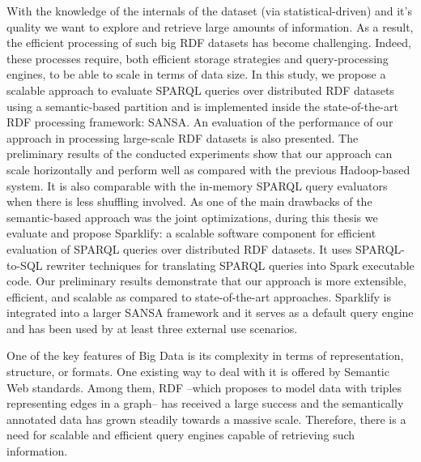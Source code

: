 With the knowledge of the internals of the dataset (via statistical-driven) and it's quality we want to explore and retrieve large amounts of information.
As a result, the efficient processing of such big RDF datasets has become challenging.
Indeed, these processes require, both efficient storage strategies and query-processing engines, to be able to scale in terms of data size.
In this study, we propose a scalable approach to evaluate SPARQL queries over distributed RDF datasets using a semantic-based partition and is implemented inside the state-of-the-art RDF processing framework: SANSA.
An evaluation of the performance of our approach in processing large-scale RDF datasets is also presented. 
The preliminary results of the conducted experiments show that our approach can scale horizontally and perform well as compared with the previous Hadoop-based system.
It is also comparable with the in-memory SPARQL query evaluators when there is less shuffling involved.
As one of the main drawbacks of the semantic-based approach was the joint optimizations, during this thesis we evaluate and propose Sparklify: a scalable software component for efficient evaluation of SPARQL queries over distributed RDF datasets. 
It uses SPARQL-to-SQL rewriter techniques for translating SPARQL queries into Spark executable code.
Our preliminary results demonstrate that our approach is more extensible, efficient, and scalable as compared to state-of-the-art approaches.
Sparklify is integrated into a larger SANSA framework and it serves as a default query engine and has been used by at least three external use scenarios.



One of the key features of Big Data is its complexity in terms of representation, structure, or formats.
One existing way to deal with it is offered by Semantic Web standards.
Among them, \gls{RDF} --which proposes to model data with triples representing edges in a graph-- has received a large success and the semantically annotated data has grown steadily towards a massive scale.
Therefore, there is a need for scalable and efficient query engines capable of retrieving such information.

